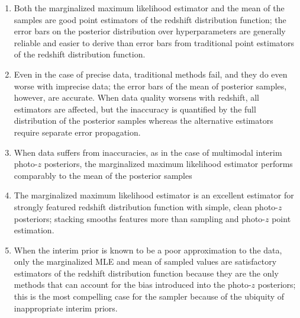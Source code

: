 \documentclass[preprint]{aastex}
\begin{document}
\begin{enumerate}
\item Both the marginalized maximum likelihood estimator and the mean of the 
samples are good point estimators of the redshift distribution function; the 
error bars on the posterior distribution over hyperparameters are generally 
reliable and easier to derive than error bars from traditional point estimators 
of the redshift distribution function.
\item Even in the case of precise data, traditional methods fail, and they do 
even worse with imprecise data; the error bars of the mean of posterior 
samples, however, are accurate.  When data quality worsens with redshift, all 
estimators are affected, but the inaccuracy is quantified by the full 
distribution of the posterior samples whereas the alternative estimators 
require separate error propagation.  
\item When data suffers from inaccuracies, as in the case of multimodal interim 
photo-$z$ posteriors, the marginalized maximum likelihood estimator performs 
comparably to the mean of the posterior samples
\item The marginalized maximum likelihood estimator is an excellent estimator 
for strongly featured redshift distribution function with simple, clean 
photo-$z$ posteriors; stacking smooths features more than sampling and 
photo-$z$ point estimation.
\item When the interim prior is known to be a poor approximation to the data, 
only the marginalized MLE and mean of sampled values are satisfactory 
estimators of the redshift distribution function because they are the only 
methods that can account for the bias introduced into the photo-$z$ posteriors; 
this is the most compelling case for the sampler because of the ubiquity of 
inappropriate interim priors.
\end{enumerate}
\end{document}
